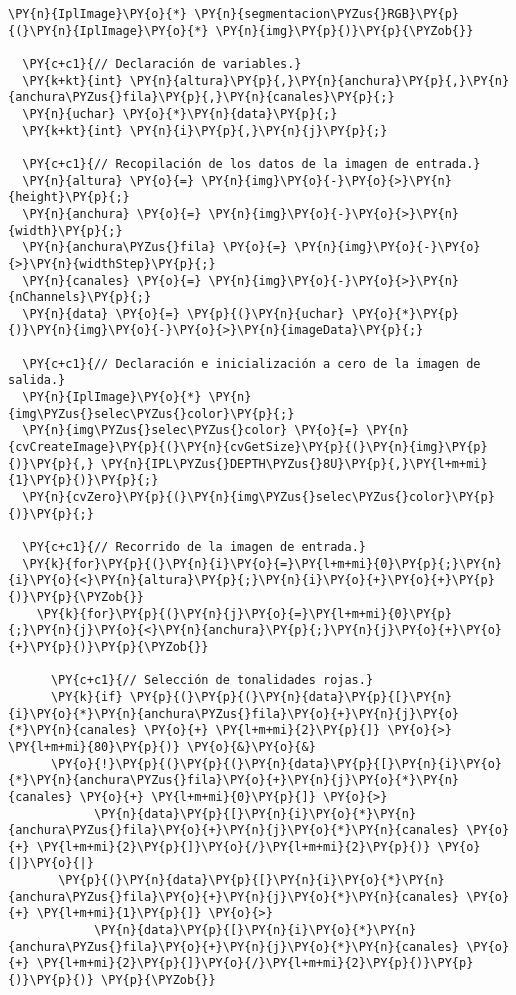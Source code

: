 \begin{Verbatim}[commandchars=\\\{\}]
\PY{n}{IplImage}\PY{o}{*} \PY{n}{segmentacion\PYZus{}RGB}\PY{p}{(}\PY{n}{IplImage}\PY{o}{*} \PY{n}{img}\PY{p}{)}\PY{p}{\PYZob{}}

  \PY{c+c1}{// Declaración de variables.}
  \PY{k+kt}{int} \PY{n}{altura}\PY{p}{,}\PY{n}{anchura}\PY{p}{,}\PY{n}{anchura\PYZus{}fila}\PY{p}{,}\PY{n}{canales}\PY{p}{;}
  \PY{n}{uchar} \PY{o}{*}\PY{n}{data}\PY{p}{;}
  \PY{k+kt}{int} \PY{n}{i}\PY{p}{,}\PY{n}{j}\PY{p}{;}
  
  \PY{c+c1}{// Recopilación de los datos de la imagen de entrada.}
  \PY{n}{altura} \PY{o}{=} \PY{n}{img}\PY{o}{-}\PY{o}{>}\PY{n}{height}\PY{p}{;}
  \PY{n}{anchura} \PY{o}{=} \PY{n}{img}\PY{o}{-}\PY{o}{>}\PY{n}{width}\PY{p}{;}
  \PY{n}{anchura\PYZus{}fila} \PY{o}{=} \PY{n}{img}\PY{o}{-}\PY{o}{>}\PY{n}{widthStep}\PY{p}{;}
  \PY{n}{canales} \PY{o}{=} \PY{n}{img}\PY{o}{-}\PY{o}{>}\PY{n}{nChannels}\PY{p}{;}
  \PY{n}{data} \PY{o}{=} \PY{p}{(}\PY{n}{uchar} \PY{o}{*}\PY{p}{)}\PY{n}{img}\PY{o}{-}\PY{o}{>}\PY{n}{imageData}\PY{p}{;}
     
  \PY{c+c1}{// Declaración e inicialización a cero de la imagen de salida.}
  \PY{n}{IplImage}\PY{o}{*} \PY{n}{img\PYZus{}selec\PYZus{}color}\PY{p}{;}  
  \PY{n}{img\PYZus{}selec\PYZus{}color} \PY{o}{=} \PY{n}{cvCreateImage}\PY{p}{(}\PY{n}{cvGetSize}\PY{p}{(}\PY{n}{img}\PY{p}{)}\PY{p}{,} \PY{n}{IPL\PYZus{}DEPTH\PYZus{}8U}\PY{p}{,}\PY{l+m+mi}{1}\PY{p}{)}\PY{p}{;}
  \PY{n}{cvZero}\PY{p}{(}\PY{n}{img\PYZus{}selec\PYZus{}color}\PY{p}{)}\PY{p}{;}

  \PY{c+c1}{// Recorrido de la imagen de entrada.}
  \PY{k}{for}\PY{p}{(}\PY{n}{i}\PY{o}{=}\PY{l+m+mi}{0}\PY{p}{;}\PY{n}{i}\PY{o}{<}\PY{n}{altura}\PY{p}{;}\PY{n}{i}\PY{o}{+}\PY{o}{+}\PY{p}{)}\PY{p}{\PYZob{}} 
    \PY{k}{for}\PY{p}{(}\PY{n}{j}\PY{o}{=}\PY{l+m+mi}{0}\PY{p}{;}\PY{n}{j}\PY{o}{<}\PY{n}{anchura}\PY{p}{;}\PY{n}{j}\PY{o}{+}\PY{o}{+}\PY{p}{)}\PY{p}{\PYZob{}}
      
      \PY{c+c1}{// Selección de tonalidades rojas.}
      \PY{k}{if} \PY{p}{(}\PY{p}{(}\PY{n}{data}\PY{p}{[}\PY{n}{i}\PY{o}{*}\PY{n}{anchura\PYZus{}fila}\PY{o}{+}\PY{n}{j}\PY{o}{*}\PY{n}{canales} \PY{o}{+} \PY{l+m+mi}{2}\PY{p}{]} \PY{o}{>} \PY{l+m+mi}{80}\PY{p}{)} \PY{o}{&}\PY{o}{&}
	  \PY{o}{!}\PY{p}{(}\PY{p}{(}\PY{n}{data}\PY{p}{[}\PY{n}{i}\PY{o}{*}\PY{n}{anchura\PYZus{}fila}\PY{o}{+}\PY{n}{j}\PY{o}{*}\PY{n}{canales} \PY{o}{+} \PY{l+m+mi}{0}\PY{p}{]} \PY{o}{>} 
            \PY{n}{data}\PY{p}{[}\PY{n}{i}\PY{o}{*}\PY{n}{anchura\PYZus{}fila}\PY{o}{+}\PY{n}{j}\PY{o}{*}\PY{n}{canales} \PY{o}{+} \PY{l+m+mi}{2}\PY{p}{]}\PY{o}{/}\PY{l+m+mi}{2}\PY{p}{)} \PY{o}{|}\PY{o}{|} 
	   \PY{p}{(}\PY{n}{data}\PY{p}{[}\PY{n}{i}\PY{o}{*}\PY{n}{anchura\PYZus{}fila}\PY{o}{+}\PY{n}{j}\PY{o}{*}\PY{n}{canales} \PY{o}{+} \PY{l+m+mi}{1}\PY{p}{]} \PY{o}{>} 
            \PY{n}{data}\PY{p}{[}\PY{n}{i}\PY{o}{*}\PY{n}{anchura\PYZus{}fila}\PY{o}{+}\PY{n}{j}\PY{o}{*}\PY{n}{canales} \PY{o}{+} \PY{l+m+mi}{2}\PY{p}{]}\PY{o}{/}\PY{l+m+mi}{2}\PY{p}{)}\PY{p}{)}\PY{p}{)} \PY{p}{\PYZob{}}
    

\end{Verbatim}
